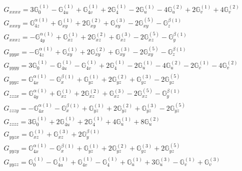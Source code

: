 \documentclass[fleqn,8pt,landscape]{jsarticle}
\begin{document}
\begin{align*}
& G_{xxxx} = 3 \mathbb{G}_{0}^{(1)} - \mathbb{G}_{4u}^{(1)} + \mathbb{G}_{4v}^{(1)} + 2 \mathbb{G}_{4}^{(1)} - 2 \mathbb{G}_{u}^{(1)} - 4 \mathbb{G}_{u}^{(2)} + 2 \mathbb{G}_{v}^{(1)} + 4 \mathbb{G}_{v}^{(2)} \\
& G_{xxxy} = \mathbb{G}_{4z}^{\alpha(1)} + \mathbb{G}_{xy}^{(1)} + 2 \mathbb{G}_{xy}^{(2)} + \mathbb{G}_{xy}^{(3)} - 2 \mathbb{G}_{xy}^{(5)} - \mathbb{G}_{z}^{\beta(1)} \\
& G_{xxxz} = - \mathbb{G}_{4y}^{\alpha(1)} + \mathbb{G}_{xz}^{(1)} + 2 \mathbb{G}_{xz}^{(2)} + \mathbb{G}_{xz}^{(3)} - 2 \mathbb{G}_{xz}^{(5)} - \mathbb{G}_{y}^{\beta(1)} \\
& G_{yyyx} = - \mathbb{G}_{4z}^{\alpha(1)} + \mathbb{G}_{xy}^{(1)} + 2 \mathbb{G}_{xy}^{(2)} + \mathbb{G}_{xy}^{(3)} - 2 \mathbb{G}_{xy}^{(5)} - \mathbb{G}_{z}^{\beta(1)} \\
& G_{yyyy} = 3 \mathbb{G}_{0}^{(1)} - \mathbb{G}_{4u}^{(1)} - \mathbb{G}_{4v}^{(1)} + 2 \mathbb{G}_{4}^{(1)} - 2 \mathbb{G}_{u}^{(1)} - 4 \mathbb{G}_{u}^{(2)} - 2 \mathbb{G}_{v}^{(1)} - 4 \mathbb{G}_{v}^{(2)} \\
& G_{yyyz} = \mathbb{G}_{4x}^{\alpha(1)} - \mathbb{G}_{x}^{\beta(1)} + \mathbb{G}_{yz}^{(1)} + 2 \mathbb{G}_{yz}^{(2)} + \mathbb{G}_{yz}^{(3)} - 2 \mathbb{G}_{yz}^{(5)} \\
& G_{zzzx} = \mathbb{G}_{4y}^{\alpha(1)} + \mathbb{G}_{xz}^{(1)} + 2 \mathbb{G}_{xz}^{(2)} + \mathbb{G}_{xz}^{(3)} - 2 \mathbb{G}_{xz}^{(5)} - \mathbb{G}_{y}^{\beta(1)} \\
& G_{zzzy} = - \mathbb{G}_{4x}^{\alpha(1)} - \mathbb{G}_{x}^{\beta(1)} + \mathbb{G}_{yz}^{(1)} + 2 \mathbb{G}_{yz}^{(2)} + \mathbb{G}_{yz}^{(3)} - 2 \mathbb{G}_{yz}^{(5)} \\
& G_{zzzz} = 3 \mathbb{G}_{0}^{(1)} + 2 \mathbb{G}_{4u}^{(1)} + 2 \mathbb{G}_{4}^{(1)} + 4 \mathbb{G}_{u}^{(1)} + 8 \mathbb{G}_{u}^{(2)} \\
& G_{yyzx} = \mathbb{G}_{xz}^{(1)} + \mathbb{G}_{xz}^{(3)} + 2 \mathbb{G}_{y}^{\beta(1)} \\
& G_{yyzy} = \mathbb{G}_{4x}^{\alpha(1)} - \mathbb{G}_{x}^{\beta(1)} + \mathbb{G}_{yz}^{(1)} + 2 \mathbb{G}_{yz}^{(2)} + \mathbb{G}_{yz}^{(3)} + 2 \mathbb{G}_{yz}^{(5)} \\
& G_{yyzz} = \mathbb{G}_{0}^{(1)} - \mathbb{G}_{4u}^{(1)} + \mathbb{G}_{4v}^{(1)} - \mathbb{G}_{4}^{(1)} + \mathbb{G}_{u}^{(1)} + 3 \mathbb{G}_{u}^{(3)} - \mathbb{G}_{v}^{(1)} + \mathbb{G}_{v}^{(3)} \\

\end{align*}
\end{document}
